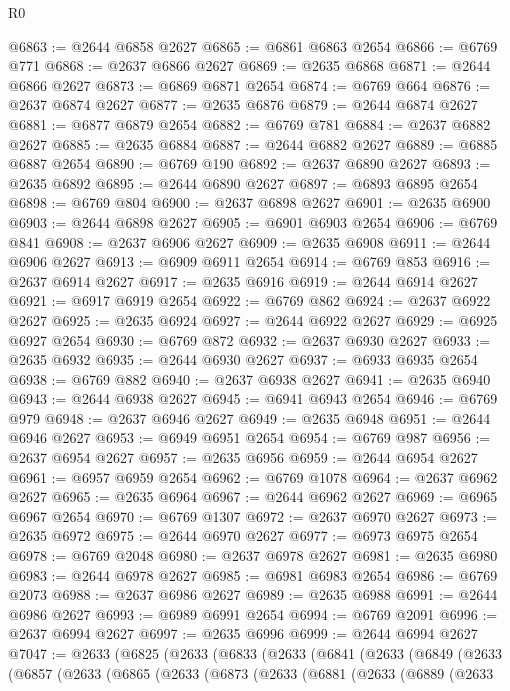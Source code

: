 \begin{lexlean}{R0}
\begin{coremodule}
@6863 := @2644 @6858 @2627
@6865 := @6861 @6863 @2654
@6866 := @6769 @771
@6868 := @2637 @6866 @2627
@6869 := @2635 @6868
@6871 := @2644 @6866 @2627
@6873 := @6869 @6871 @2654
@6874 := @6769 @664
@6876 := @2637 @6874 @2627
@6877 := @2635 @6876
@6879 := @2644 @6874 @2627
@6881 := @6877 @6879 @2654
@6882 := @6769 @781
@6884 := @2637 @6882 @2627
@6885 := @2635 @6884
@6887 := @2644 @6882 @2627
@6889 := @6885 @6887 @2654
@6890 := @6769 @190
@6892 := @2637 @6890 @2627
@6893 := @2635 @6892
@6895 := @2644 @6890 @2627
@6897 := @6893 @6895 @2654
@6898 := @6769 @804
@6900 := @2637 @6898 @2627
@6901 := @2635 @6900
@6903 := @2644 @6898 @2627
@6905 := @6901 @6903 @2654
@6906 := @6769 @841
@6908 := @2637 @6906 @2627
@6909 := @2635 @6908
@6911 := @2644 @6906 @2627
@6913 := @6909 @6911 @2654
@6914 := @6769 @853
@6916 := @2637 @6914 @2627
@6917 := @2635 @6916
@6919 := @2644 @6914 @2627
@6921 := @6917 @6919 @2654
@6922 := @6769 @862
@6924 := @2637 @6922 @2627
@6925 := @2635 @6924
@6927 := @2644 @6922 @2627
@6929 := @6925 @6927 @2654
@6930 := @6769 @872
@6932 := @2637 @6930 @2627
@6933 := @2635 @6932
@6935 := @2644 @6930 @2627
@6937 := @6933 @6935 @2654
@6938 := @6769 @882
@6940 := @2637 @6938 @2627
@6941 := @2635 @6940
@6943 := @2644 @6938 @2627
@6945 := @6941 @6943 @2654
@6946 := @6769 @979
@6948 := @2637 @6946 @2627
@6949 := @2635 @6948
@6951 := @2644 @6946 @2627
@6953 := @6949 @6951 @2654
@6954 := @6769 @987
@6956 := @2637 @6954 @2627
@6957 := @2635 @6956
@6959 := @2644 @6954 @2627
@6961 := @6957 @6959 @2654
@6962 := @6769 @1078
@6964 := @2637 @6962 @2627
@6965 := @2635 @6964
@6967 := @2644 @6962 @2627
@6969 := @6965 @6967 @2654
@6970 := @6769 @1307
@6972 := @2637 @6970 @2627
@6973 := @2635 @6972
@6975 := @2644 @6970 @2627
@6977 := @6973 @6975 @2654
@6978 := @6769 @2048
@6980 := @2637 @6978 @2627
@6981 := @2635 @6980
@6983 := @2644 @6978 @2627
@6985 := @6981 @6983 @2654
@6986 := @6769 @2073
@6988 := @2637 @6986 @2627
@6989 := @2635 @6988
@6991 := @2644 @6986 @2627
@6993 := @6989 @6991 @2654
@6994 := @6769 @2091
@6996 := @2637 @6994 @2627
@6997 := @2635 @6996
@6999 := @2644 @6994 @2627
@7047 := @2633
    (@6825
      (@2633
        (@6833
          (@2633
            (@6841
              (@2633
                (@6849
                  (@2633
                    (@6857
                      (@2633
                        (@6865
                          (@2633
                            (@6873
                              (@2633
                                (@6881
                                  (@2633
                                    (@6889
                                      (@2633

\end{coremodule}
\end{lexlean}

